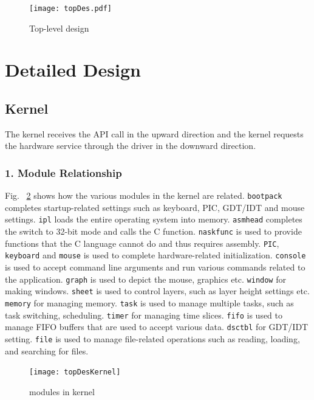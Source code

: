 \documentclass{swfcthesis}
\begin{document}
\begin{figure}[!htbp]
  \centering
  \texttt{[image: topDes.pdf]}
  \caption{Top-level design}
  \label{fig:top-level}
\end{figure}


\section{Detailed Design}
\label{sec:detailed-design}



\subsection{Kernel}
\label{sec:kernel}
The kernel receives the API call in the upward direction and the kernel requests the
hardware service through the driver in the downward direction.

\subsubsection{1. Module Relationship}
\label{sec:overview-1}

Fig. ~\ref{fig:kernel} shows how the various modules in
the kernel are related. \texttt{bootpack} completes startup-related settings such as
keyboard, PIC, GDT/IDT and mouse settings. \texttt{ipl} loads the entire operating system
into memory. \texttt{asmhead} completes the switch to 32-bit mode and calls the C
function. \texttt{naskfunc} is used to provide functions that the C language cannot do and
thus requires assembly. \texttt{PIC}, \texttt{keyboard} and \texttt{mouse} is used to
complete hardware-related initialization. \texttt{console} is used to accept command line
arguments and run various commands related to the application. \texttt{graph} is used to
depict the mouse, graphics etc. \texttt{window} for making windows. \texttt{sheet} is used to
control layers, such as layer height settings etc. \texttt{memory} for managing
memory. \texttt{task} is used to manage multiple tasks, such as task switching,
scheduling. \texttt{timer} for managing time slices. \texttt{fifo} is used to manage FIFO buffers
that are used to accept various data. \texttt{dsctbl} for GDT/IDT setting. \texttt{file} is used to
manage file-related operations such as reading, loading, and searching for files. 


\begin{figure}[!htbp]
  \centering
  \texttt{[image: topDesKernel]}
  \caption{modules in kernel}
  \label{fig:kernel}
\end{figure}
\end{document}

